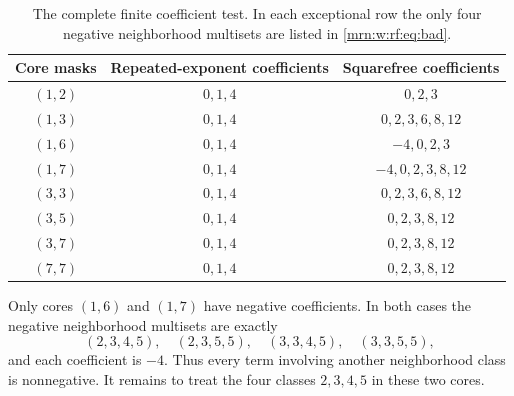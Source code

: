 \documentclass[11pt,a4paper]{article}
\theoremstyle{remark}\newtheorem{remark}[theorem]{Remark}
\begin{document}
\begin{table}[ht]
\centering
\begin{tabular}{ccc}
\toprule
Core masks & Repeated-exponent coefficients & Squarefree coefficients\\
\midrule
$(1,2)$ & $0,1,4$ & $0,2,3$\\
$(1,3)$ & $0,1,4$ & $0,2,3,6,8,12$\\
$(1,6)$ & $0,1,4$ & $-4,0,2,3$\\
$(1,7)$ & $0,1,4$ & $-4,0,2,3,8,12$\\
$(3,3)$ & $0,1,4$ & $0,2,3,6,8,12$\\
$(3,5)$ & $0,1,4$ & $0,2,3,8,12$\\
$(3,7)$ & $0,1,4$ & $0,2,3,8,12$\\
$(7,7)$ & $0,1,4$ & $0,2,3,8,12$\\
\bottomrule
\end{tabular}
\caption{The complete finite coefficient test. In each exceptional row the only four negative neighborhood multisets are listed in \eqref{mrn:w:rf:eq:bad}.}\label{mrn:w:rf:tab:coeff}
\end{table}

Only cores $(1,6)$ and $(1,7)$ have negative coefficients. In both cases the negative neighborhood multisets are exactly
\begin{equation}\label{mrn:w:rf:eq:bad}
 (2,3,4,5),\quad(2,3,5,5),\quad(3,3,4,5),\quad(3,3,5,5),
\end{equation}
and each coefficient is $-4$. Thus every term involving another neighborhood class is nonnegative. It remains to treat the four classes $2,3,4,5$ in these two cores.
\end{document}
